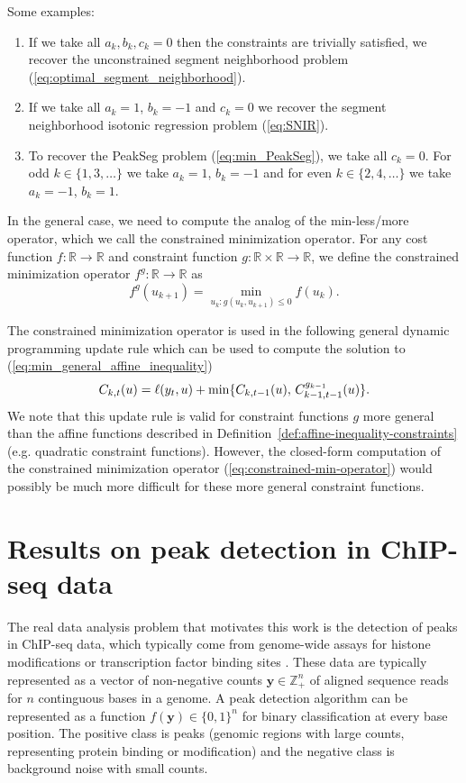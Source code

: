 \documentclass{article}
\newcommand{\ZZ}{\mathbb Z}
\newcommand{\RR}{\mathbb R}
\begin{document}
Some examples:
\begin{enumerate}
\item If we take all $a_k,b_k,c_k=0$ then the constraints are
  trivially satisfied, we
  recover the unconstrained segment neighborhood problem
  (\ref{eq:optimal_segment_neighborhood}).
\item If we take all $a_{k} =1$, $b_{k}=-1$ and $c_{k} = 0$ we
  recover the segment neighborhood isotonic regression problem (\ref{eq:SNIR}).
\item To recover the PeakSeg problem (\ref{eq:min_PeakSeg}),
  we take all $c_{k} = 0$. For odd $k\in\{1,3,\dots\}$ we take
  $a_{k} =1$, $b_{k}=-1$ and for even $k\in\{2,4,\dots\}$ we take
  $a_{k} =-1$, $b_{k}=1$.
\end{enumerate}

In the general case, we need to compute the analog of the
min-less/more operator, which we call the constrained minimization
operator. For any cost function $f:\RR\rightarrow\RR$ and constraint
function $g:\RR\times\RR\rightarrow\RR$, we define the constrained
minimization operator $f^g:\RR\rightarrow\RR$ as
\begin{equation}
  \label{eq:constrained-min-operator}
  f^g(u_{k+1}) = \min_{u_k : g(u_k, u_{k+1})\leq 0} f(u_k).
\end{equation}

The constrained minimization operator is used in the following general
dynamic programming update rule which can be used to compute the
solution to (\ref{eq:min_general_affine_inequality})
\begin{equation}
  \label{eq:general_dp}
  C_{k,t}(u) = \ell(y_t,u) + \min\{
  C_{k,t-1}(u),\,
  C_{k-1,t-1}^{g_{k-1}}(u)
  \}.
\end{equation}
We note that this update rule is valid for constraint functions $g$
more general than the affine functions described in
Definition~\ref{def:affine-inequality-constraints} (e.g. quadratic
constraint functions). However, the closed-form computation of the
constrained minimization operator (\ref{eq:constrained-min-operator})
would possibly be much more difficult for these more general constraint functions. 

\section{Results on peak detection in ChIP-seq data}
\label{sec:results-chip-seq}

The real data analysis problem that motivates this work is the
detection of peaks in ChIP-seq data, which typically come from
genome-wide assays for histone modifications or transcription factor
binding sites \citep{practical}. These data are typically represented
as a vector of non-negative counts $\mathbf y\in\ZZ_+^n$ of aligned
sequence reads for $n$ continguous bases in a genome. A peak detection
algorithm can be represented as a function $f(\mathbf y)\in\{0,1\}^n$
for binary classification at every base position. The positive class
is peaks (genomic regions with large counts, representing protein
binding or modification) and the negative class is background noise
with small counts.
\end{document}
